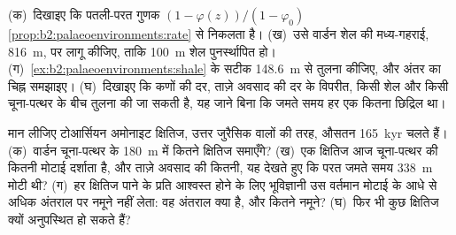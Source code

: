 \begin{exercise}[$\star\star\star$]\label{exo:b2:palaeoenvironments:11}
(क)~दिखाइए कि पतली-परत गुणक $(1 - \varphi(z))/(1 - \varphi_0)$
\cref{prop:b2:palaeoenvironments:rate} से निकलता है। (ख)~उसे वार्डन शेल की मध्य-गहराई,
\qty{816}{m}, पर लागू कीजिए, ताकि \qty{100}{m} शेल पुनर्स्थापित हो। (ग)~\cref{ex:b2:palaeoenvironments:shale} के सटीक \qty{148.6}{m} से
तुलना कीजिए, और अंतर का चिह्न समझाइए। (घ)~दिखाइए कि
कणों की दर, ताज़े अवसाद की दर के विपरीत, किसी शेल और किसी चूना-पत्थर के बीच तुलना की जा सकती है,
यह जाने बिना कि जमते समय हर एक कितना छिद्रिल था।
\end{exercise}

\begin{exercise}[$\star\star\star$]\label{exo:b2:palaeoenvironments:12}
मान लीजिए टोआर्सियन अमोनाइट क्षितिज, उत्तर जुरैसिक वालों की तरह, औसतन \qty{165}{kyr} चलते हैं।
(क)~वार्डन चूना-पत्थर के \qty{180}{m} में कितने क्षितिज समाएँगे? (ख)~एक क्षितिज आज चूना-पत्थर की कितनी
मोटाई दर्शाता है, और ताज़े अवसाद की कितनी, यह देखते हुए कि
परत जमते समय \qty{338}{m} मोटी थी? (ग)~हर क्षितिज पाने के प्रति आश्वस्त होने के लिए
भूविज्ञानी उस वर्तमान मोटाई के आधे से अधिक अंतराल पर नमूने नहीं लेता: वह अंतराल क्या है, और कितने
नमूने? (घ)~फिर भी कुछ क्षितिज क्यों अनुपस्थित हो सकते हैं?
\end{exercise}


